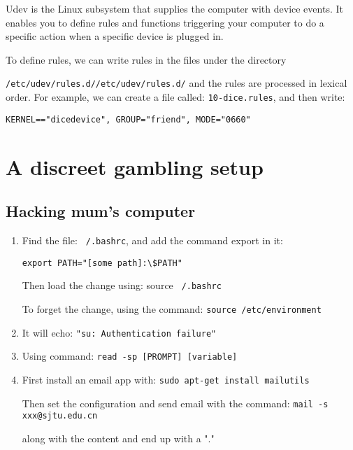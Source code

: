 \documentclass[12pt,a4paper]{article}
\theoremstyle{definition}
\begin{document}
\begin{enumerate}
Udev is the Linux subsystem that supplies the computer with device events. It enables you to define rules and functions triggering your computer to do a specific action when a specific device is plugged in.

To define rules, we can write rules in the files under the directory 

\texttt{/etc/udev/rules.d//etc/udev/rules.d/} and the rules are processed in lexical order. For example, we can create a file called: \texttt{10-dice.rules}, and then write:

\begin{verbatim}
KERNEL=="dicedevice", GROUP="friend", MODE="0660"
\end{verbatim}
\end{enumerate}

\section{A discreet gambling setup}
\subsection{Hacking mum’s computer}
\begin{enumerate}
\item Find the file: \texttt{~/.bashrc}, and add the command export in it:

\begin{verbatim}
export PATH="[some path]:\$PATH"
\end{verbatim}


Then load the change using: source \texttt{~/.bashrc}

To forget the change, using the command:  \texttt{source /etc/environment }
\item It will echo: \texttt{"su: Authentication failure"}
\item Using command: \texttt{read -sp [PROMPT] [variable]}
\item First install an email app with: \texttt{sudo apt-get install mailutils}

Then set the configuration and send email with the command: \texttt{mail -s xxx@sjtu.edu.cn}

along with the content and end up with a "."
\end{enumerate}
\end{document}
